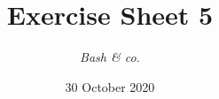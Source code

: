 




\title{{\vspace{-12mm}\huge\textbf{Exercise Sheet 5}}}
\author{\textit{Bash \& co.}}
\date{{\small 30 October 2020}}


    \maketitle
    \bigskip
    
    \bigskip
    
    \bigskip
    
